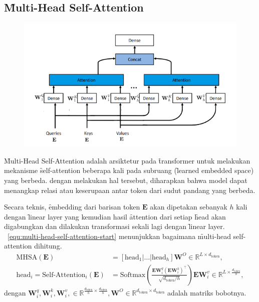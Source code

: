 	\subsection{\f{Multi-Head Self-Attention}}
	\begin{figure}
		\centering
		\includegraphics[width=1\textwidth]{assets/pics/MHSA.png}
		\label{fig:multi-head-self-attention}
	\end{figure}

	\f{Multi-Head Self-Attention} adalah arsiktetur pada \f{transformer} untuk melakukan mekanisme \f{self-attention} beberapa kali pada subruang (\f{learned embedded space}) yang berbeda. dengan melakukan hal tersebut, diharapkan bahwa model dapat menangkap relasi atau keserupaan antar token dari sudut pandang yang berbeda. 

	Secara teknis, \f{embedding} dari barisan token $\mathbf{E}$ akan dipetakan sebanyak $h$ kali dengan \f{linear layer} yang kemudian hasil \f{attention} dari setiap \f{head} akan digabungkan dan dilakukan transformasi sekali lagi dengan \f{linear layer}. \equ~\ref{equ:multi-head-self-attention-start} menunjukkan bagaimana \f{multi-head self-attention} dihitung.
	\begin{align}
		\label{equ:multi-head-self-attention-start}
		\text{MHSA}(\mathbf{E}) &= [\text{head}_1 | \dots | \text{head}_h] \mathbf{W}^O \in \mathbb{R}^{L \times d_{\text{token}}}, \\
		\text{head}_i = \text{Self-Attention}_i(\mathbf{E}) &= \text{Softmax}(\frac{\mathbf{E} \mathbf{W}^q_i (\mathbf{E} \mathbf{W}^k_i)^{\top}}{\sqrt{d_{\text{token}}/h}}) \mathbf{E} \mathbf{W}^v_i  \in  \mathbb{R}^{L \times \frac{d_{\text{token}}}{h}},
	\end{align}
	dengan $\mathbf{W}^q_i, \mathbf{W}^k_i, \mathbf{W}^v_i,\in \mathbb{R}^{\frac{d_{\text{token}}}{h} \times \frac{d_{\text{token}}}{h}}, \mathbf{W}^O \in \mathbb{R}^{d_{\text{token}} \times d_{\text{token}}}$ adalah matriks bobotnya.

